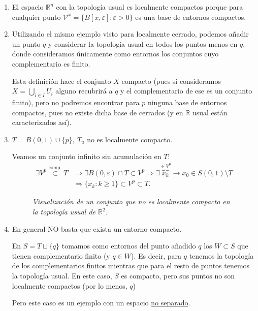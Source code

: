 \begin{ej}
\begin{enumerate}
    \item El espacio $\mathbb{R}^n$ con la topología usual es localmente compactos porque para cualquier punto $\mathcal{V}^x = \{B\left[ x, \varepsilon \right] : \varepsilon > 0\}$ es una base de entornos compactos.
    
    \item Utilizando el mismo ejemplo visto para localmente cerrado, podemos añadir un punto $q$ y considerar la topología usual en todos los puntos menos en $q$, donde consideramos únicamente como entornos los conjuntos cuyo complementario es finito.

    Esta definición hace el conjunto $X$ compacto (pues si consideramos $X=\bigcup_{i\in I} U_i$ alguno recubrirá a $q$ y el complementario de ese es un conjunto finito), pero no podremos encontrar para $p$ ninguna base de entornos compactos, pues no existe dicha base de cerrados (y en $\mathbb{R}$ usual están caracterizados así).

    \item $T = B\left( 0, 1 \right) \cup \{p\},\ T_u$ no es localmente compacto.
    \begin{demo}
    Veamos un conjunto infinito sin acumulación en $T$:
    \begin{align*}
        \exists V^p \stackrel{\text{comp.}}{\subset} T &\Rightarrow \exists B\left( 0, \varepsilon \right) \cap T \subset V^p \Rightarrow \exists \overbrace{x_k}^{\in V^p} \rightarrow x_0 \in S\left( 0, 1 \right) \setminus T\\
       &\Rightarrow \{x_k : k \ge 1\} \subset V^p \subset T 
    .\end{align*}
    \end{demo}

    \begin{figure}[H]
        \centering
        \caption{\textit{Visualización de un conjunto que no es localmente compacto en la topología usual de $\mathbb{R}^2$.}}
        \label{fig:usual-no-localmente-compacto}
    \end{figure}

    \item En general NO basta que exista un entorno compacto.

    En $S = T \sqcup \{q\}$ tomamos como entornos del punto añadido $q$ los $W \subset S$ que tienen complementario finito (y $q \in W$). 
    Es decir, para $q$ tenemos la topología de los complementarios finitos mientras que para el resto de puntos tenemos la topología usual.
    En este caso, $S$ es compacto, pero sus puntos no son localmente compactos (por lo menos, $q$)

    Pero este caso es un ejemplo con un espacio \underline{no separado}.
\end{enumerate}
\end{ej}

